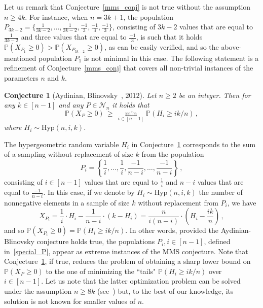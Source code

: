 \documentclass[11pt]{article}
\newtheorem{conjecture}{Conjecture}
\newcommand{\Prb}{\mathbb{P}}
\begin{document}
Let us remark that 
Conjecture~\ref{mms_conj} is not true without the assumption $n\ge 4k$. 
For instance, when $n=3k+1$,  the population 
$P_{3k-2}=\{\frac{1}{3k-2},\ldots,\frac{1}{3k-2},\frac{-1}{3}, \frac{-1}{3},\frac{-1}{3}\}$, consisting of $3k-2$ values that are equal to $\frac{1}{3k-2}$ and three values that are equal to $\frac{-1}{3}$, is such that it holds   $\Prb(X_{P_1}\ge 0) > \Prb(X_{P_{3k-2}}\ge 0)$, as can be easily verified, and so  the above-mentioned population $P_1$ is not minimal in this case. 
The following statement is a refinement of Conjecture~\ref{mms_conj} that covers all  non-trivial instances of the parameters $n$ and $k$. 

\begin{conjecture}[Aydinian, Blinovsky~\cite{Aydinian_Blinovsky}, $2012$]
\label{AB_conj}
Let $n\ge 2$ be an integer. Then 
for any $k\in [n-1]$ and any $P\in\mathcal{N}_n$ it holds  that 
\[
\Prb(X_P \ge 0) \,\ge\, \min_{i\in [n-1]} \Prb(H_i \ge ik/n) \, ,  
\]
where $H_i\sim\text{Hyp}(n,i,k)$. 
\end{conjecture}
The hypergeometric random variable $H_i$ in Conjecture~\ref{AB_conj} corresponds to the sum of a sampling  without replacement of size $k$ from the population 
\begin{equation}\label{special_P}
P_i = \left\{\frac{1}{i}, \ldots,\frac{1}{i}, \frac{-1}{n-i},\ldots,\frac{-1}{n-i}\right\} \, ,  
\end{equation}
consisting of $i\in [n-1]$ values that are equal to $\frac{1}{i}$ and $n-i$ values that are equal to $\frac{-1}{n-i}$. 
In this case, if we denote by $H_i\sim\text{Hyp}(n,i,k)$ the number of nonnegative elements in a sample of size $k$ without replacement from $P_i$, we have 
\[
X_{P_i} = \frac{1}{i}\cdot H_i - \frac{1}{n-i}\cdot (k-H_i) = \frac{n}{i(n-i)} \cdot \left( H_i - \frac{ik}{n}\right) \, ,
\]
and so $\Prb(X_{P_i}\ge 0) = \Prb(H_i \ge ik/n)$. 
In other words, provided the Aydinian-Blinovsky conjecture holds true, the populations $P_i, i\in [n-1]$, defined in~\eqref{special_P},  appear as extreme instances of the MMS conjecture. 
Note that Conjecture~\ref{AB_conj}, if true, reduces the problem of obtaining a sharp lower bound on $\Prb(X_P\ge 0)$ to the one of minimizing  the  ``tails"  $\Prb(H_i\ge ik/n)$ over $i\in [n-1]$.  Let us note that the latter optimization  problem can be solved under the assumption $n\ge 8k$ (see~\cite{Ai_Pelekis}) but, to the best of our knowledge, its solution is not known for smaller values of $n$. 
\end{document}
